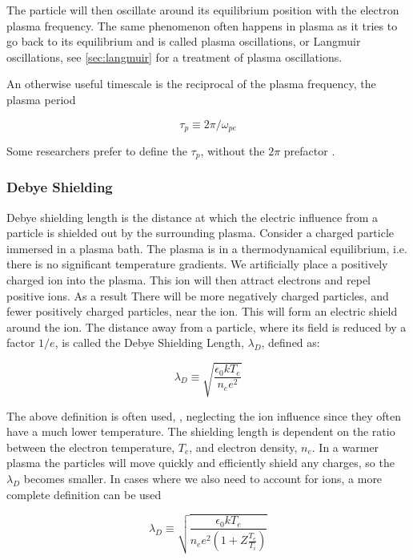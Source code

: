 		The particle will then oscillate around its equilibrium position with
		the electron plasma frequency. The same phenomenon often happens in plasma as
		it tries to go back to its equilibrium and is called plasma oscillations,
		or Langmuir oscillations, see \cref{sec:langmuir} for a treatment of plasma oscillations.

		An otherwise useful timescale is the reciprocal of the plasma frequency,
		the plasma period

		\begin{equation}
			\tau_p \equiv 2\pi/\omega_{pe}
		\end{equation}

		Some researchers prefer to define the \(\tau_p\), without the \(2\pi\) prefactor \citep{fitzpatrick_plasma_2014}.

		\subsubsection{Debye Shielding}
		Debye shielding length is the distance at which the electric influence
		from a particle is shielded out by the surrounding plasma.
		Consider a charged particle immersed in a plasma bath. The plasma is in
		a thermodynamical equilibrium, i.e. there is no significant temperature
		gradients. We artificially place a positively charged ion into the plasma.
		This ion will then attract electrons and repel positive ions. As a result There will
		be more negatively charged particles, and fewer positively charged particles, near the
		ion. This will form an electric shield around the ion. The
		distance away from a particle, where its field is reduced by a factor \(1/e\),
		is called the Debye Shielding Length, \(\lambda_D\), defined as:

		\begin{equation}
			\lambda_D \equiv \sqrt{\frac{\epsilon_0 kT_e}{n_e e^2}}
		\end{equation}

		The above definition is often used, \citep{pecseli_waves_2012},
		neglecting the ion influence since they often have a much lower temperature.
		The shielding length is dependent on the ratio between the electron temperature, \(T_e\),
		and electron density, \(n_e\). In a warmer plasma the particles will move quickly
		and efficiently shield any charges, so the \(\lambda_D\) becomes smaller.
		In cases where we also need to account for ions, a more complete definition can be used

		\begin{equation}
			\lambda_D \equiv \sqrt{\frac{\epsilon_0 k T_e}{n_e e^2(1+Z \frac{T_e}{T_i})}}
		\end{equation}

